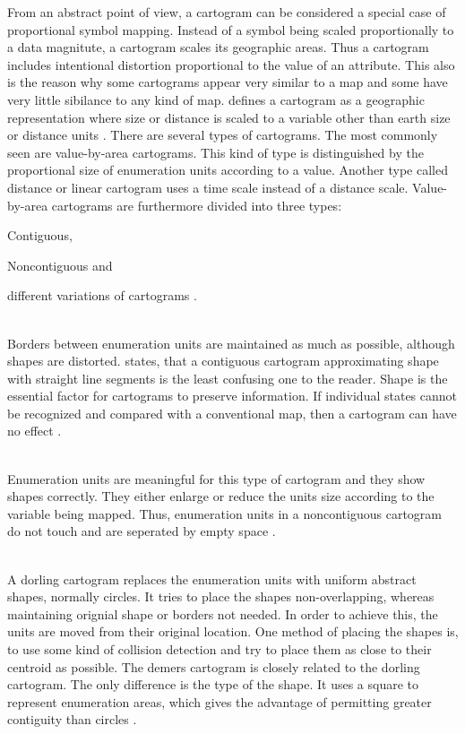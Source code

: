 From an abstract point of view, a cartogram can be considered a special case of proportional symbol mapping. Instead of a symbol being scaled proportionally to a data magnitute, a cartogram scales its geographic areas. Thus a cartogram includes intentional distortion proportional to the value of an attribute. This also is the reason why some cartograms appear very similar to a map and some have very little sibilance to any kind of map. \citeauthor{Tyner2010} defines a cartogram as a geographic representation where size or distance is scaled to a variable other than earth size or distance units .
There are several types of cartograms. The most commonly seen are value-by-area cartograms. This kind of type is distinguished by the proportional size of enumeration units according to a value. Another type called distance or linear cartogram uses a time scale instead of a distance scale. Value-by-area cartograms are furthermore divided into three types:
\begin{enumerate*}
\item Contiguous,
\item Noncontiguous and
\item different variations of cartograms .
\end{enumerate*}

\begin{enumerate}

 \hfill \\
Borders between enumeration units are maintained as much as possible, although shapes are distorted. \citeauthor{Tyner2010} states, that a contiguous cartogram approximating shape with straight line segments is the least confusing one to the reader. Shape is the essential factor for cartograms to preserve information. If individual states cannot be recognized and compared with a conventional map, then a cartogram can have no effect .

 \hfill \\
Enumeration units are meaningful for this type of cartogram and they show shapes correctly. They either enlarge or reduce the units size according to the variable being mapped. Thus, enumeration units in a noncontiguous cartogram do not touch and are seperated by empty space .

 \hfill \\
A dorling cartogram replaces the enumeration units with uniform abstract shapes, normally circles. It tries to place the shapes non-overlapping, whereas maintaining orignial shape or borders not needed. In order to achieve this, the units are moved from their original location. One method of placing the shapes is, to use some kind of collision detection and try to place them as close to their centroid as possible. The demers cartogram is closely related to the dorling cartogram. The only difference is the type of the shape. It uses a square to represent enumeration areas, which gives the advantage of permitting greater contiguity than circles .

\end{enumerate}

